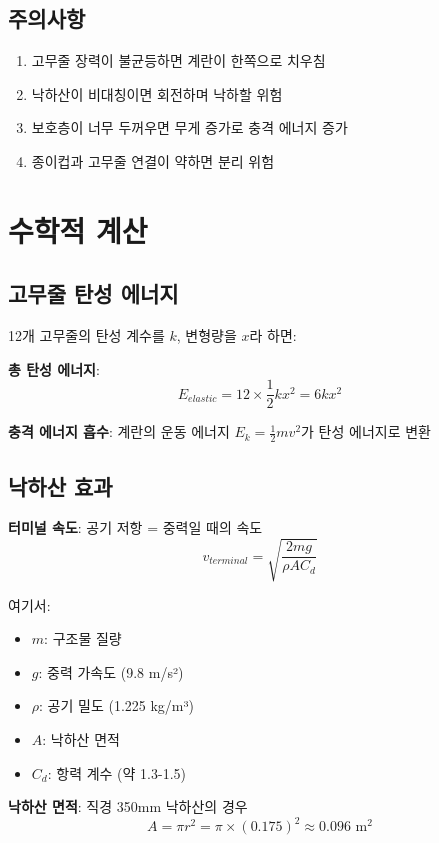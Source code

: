 \documentclass[a4paper,12pt]{article}
\begin{document}
\begin{CJK}{UTF8}{mj}
\subsection{주의사항}

\begin{enumerate}
    \item 고무줄 장력이 불균등하면 계란이 한쪽으로 치우침
    \item 낙하산이 비대칭이면 회전하며 낙하할 위험
    \item 보호층이 너무 두꺼우면 무게 증가로 충격 에너지 증가
    \item 종이컵과 고무줄 연결이 약하면 분리 위험
\end{enumerate}

\section{수학적 계산}

\subsection{고무줄 탄성 에너지}

12개 고무줄의 탄성 계수를 $k$, 변형량을 $x$라 하면:

\textbf{총 탄성 에너지}:
\[
E_{elastic} = 12 \times \frac{1}{2}kx^2 = 6kx^2
\]

\textbf{충격 에너지 흡수}:
계란의 운동 에너지 $E_k = \frac{1}{2}mv^2$가 탄성 에너지로 변환

\subsection{낙하산 효과}

\textbf{터미널 속도}:
공기 저항 = 중력일 때의 속도
\[
v_{terminal} = \sqrt{\frac{2mg}{\rho A C_d}}
\]

여기서:
\begin{itemize}
    \item $m$: 구조물 질량
    \item $g$: 중력 가속도 (9.8 m/s²)
    \item $\rho$: 공기 밀도 (1.225 kg/m³)
    \item $A$: 낙하산 면적
    \item $C_d$: 항력 계수 (약 1.3-1.5)
\end{itemize}

\textbf{낙하산 면적}:
직경 350mm 낙하산의 경우
\[
A = \pi r^2 = \pi \times (0.175)^2 \approx 0.096 \text{ m}^2
\]


\end{CJK}
\end{document}
